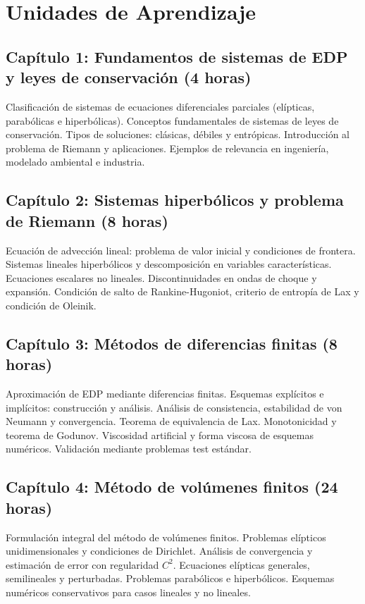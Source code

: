 \section{Unidades de Aprendizaje}

\subsection*{Capítulo 1: Fundamentos de sistemas de EDP y leyes de conservación (4 horas)}

Clasificación de sistemas de ecuaciones diferenciales parciales
(elípticas, parabólicas e hiperbólicas).
Conceptos fundamentales de sistemas de leyes de conservación.
Tipos de soluciones: clásicas, débiles y entrópicas.
Introducción al problema de Riemann y aplicaciones.
Ejemplos de relevancia en ingeniería, modelado ambiental e industria.

\subsection*{Capítulo 2: Sistemas hiperbólicos y problema de Riemann (8 horas)}

Ecuación de advección lineal: problema de valor inicial y condiciones
de frontera.
Sistemas lineales hiperbólicos y descomposición en variables
características.
Ecuaciones escalares no lineales.
Discontinuidades en ondas de choque y expansión.
Condición de salto de Rankine-Hugoniot, criterio de entropía de Lax y
condición de Oleinik.

\subsection*{Capítulo 3: Métodos de diferencias finitas (8 horas)}

Aproximación de EDP mediante diferencias finitas.
Esquemas explícitos e implícitos: construcción y análisis.
Análisis de consistencia, estabilidad de von Neumann y convergencia.
Teorema de equivalencia de Lax.
Monotonicidad y teorema de Godunov.
Viscosidad artificial y forma viscosa de esquemas numéricos.
Validación mediante problemas test estándar.

\subsection*{Capítulo 4: Método de volúmenes finitos (24 horas)}

Formulación integral del método de volúmenes finitos.
Problemas elípticos unidimensionales y condiciones de Dirichlet.
Análisis de convergencia y estimación de error con regularidad $C^{2}$.
Ecuaciones elípticas generales, semilineales y perturbadas.
Problemas parabólicos e hiperbólicos.
Esquemas numéricos conservativos para casos lineales y no lineales.

